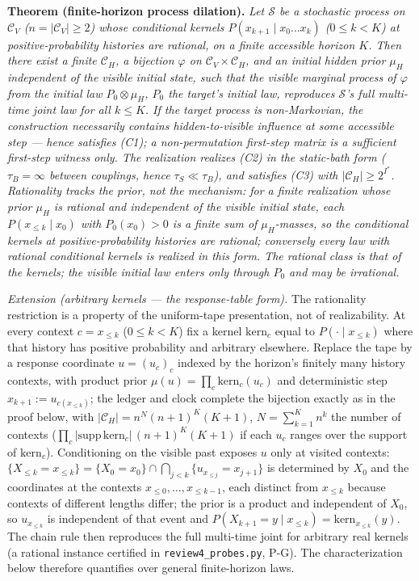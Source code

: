 \documentclass[
]{article}
\begin{document}
\textbf{Theorem (finite-horizon process dilation).} \emph{Let
\(\mathcal{S}\) be a stochastic process on \(\mathcal{C}_V\)
(\(n = |\mathcal{C}_V| \geq 2\)) whose conditional kernels
\(P(x_{k+1} \mid x_0 \ldots x_k)\) (\(0 \leq k < K\)) at
positive-probability histories are rational, on a finite accessible
horizon \(K\). Then there exist a finite \(\mathcal{C}_H\), a bijection
\(\varphi\) on \(\mathcal{C}_V \times \mathcal{C}_H\), and an initial
hidden prior \(\mu_H\) independent of the visible initial state, such
that the visible marginal process of \(\varphi\) from the initial law
\(P_0 \otimes \mu_H\), \(P_0\) the target's initial law, reproduces
\(\mathcal{S}\)'s full multi-time joint law for all \(k \leq K\). If the
target process is non-Markovian, the construction necessarily contains
hidden-to-visible influence at some accessible step --- hence satisfies
(C1); a non-permutation first-step matrix is a sufficient first-step
witness only. The realization realizes (C2) in the static-bath form
(\(\tau_B = \infty\) between couplings, hence \(\tau_S \ll \tau_B\)),
and satisfies (C3) with \(|\mathcal{C}_H| \geq 2^{I^*}\). Rationality
tracks the prior, not the mechanism: for a finite realization whose
prior \(\mu_H\) is rational and independent of the visible initial
state, each \(P(x_{\leq k} \mid x_0)\) with \(P_0(x_0) > 0\) is a finite
sum of \(\mu_H\)-masses, so the conditional kernels at
positive-probability histories are rational; conversely every law with
rational conditional kernels is realized in this form. The rational
class is that of the kernels; the visible initial law enters only
through \(P_0\) and may be irrational.}

\emph{Extension (arbitrary kernels --- the response-table form).} The
rationality restriction is a property of the uniform-tape presentation,
not of realizability. At every context \(c = x_{\leq k}\)
(\(0 \leq k < K\)) fix a kernel \(\mathrm{kern}_c\) equal to
\(P(\cdot \mid x_{\leq k})\) where that history has positive probability
and arbitrary elsewhere. Replace the tape by a response coordinate
\(u = (u_c)_c\) indexed by the horizon's finitely many history contexts,
with product prior \(\mu(u) = \prod_c \mathrm{kern}_c(u_c)\) and
deterministic step \(x_{k+1} := u_{c(x_{\leq k})}\); the ledger and
clock complete the bijection exactly as in the proof below, with
\(|\mathcal{C}_H| = n^{N}(n{+}1)^K(K{+}1)\), \(N = \sum_{k=1}^{K} n^k\)
the number of contexts
(\(\prod_c |\mathrm{supp}\,\mathrm{kern}_c|\,(n{+}1)^K(K{+}1)\) if each
\(u_c\) ranges over the support of \(\mathrm{kern}_c\)). Conditioning on
the visible past exposes \(u\) only at visited contexts:
\(\{X_{\leq k} = x_{\leq k}\} = \{X_0 = x_0\} \cap \bigcap_{j<k} \{u_{x_{\leq j}} = x_{j+1}\}\)
is determined by \(X_0\) and the coordinates at the contexts
\(x_{\leq 0}, \ldots, x_{\leq k-1}\), each distinct from \(x_{\leq k}\)
because contexts of different lengths differ; the prior is a product and
independent of \(X_0\), so \(u_{x_{\leq k}}\) is independent of that
event and
\(P(X_{k+1} = y \mid x_{\leq k}) = \mathrm{kern}_{x_{\leq k}}(y)\). The
chain rule then reproduces the full multi-time joint for arbitrary real
kernels (a rational instance certified in \texttt{review4\_probes.py},
P-G). The characterization below therefore quantifies over general
finite-horizon laws.
\end{document}
